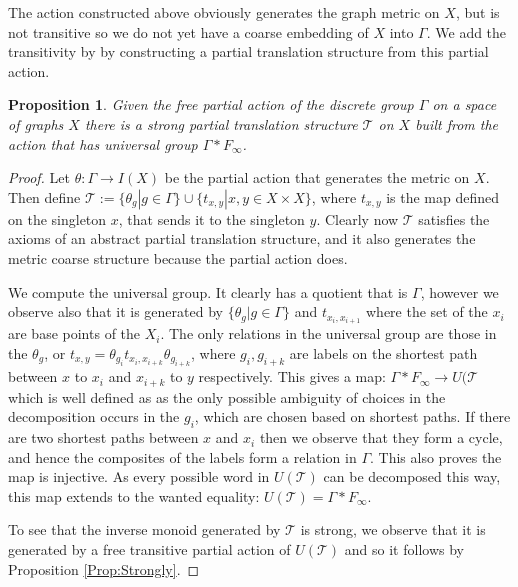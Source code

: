 \documentclass[11pt,a4paper]{amsart}
\theoremstyle{plain}
\newtheorem{proposition}[theorem]{Proposition}%
\theoremstyle{definition}%
\theoremstyle{remark}%
\begin{document}
The action constructed above obviously generates the graph metric on $X$, but is not transitive so we do not yet have a coarse embedding of $X$ into $\Gamma$. We add the transitivity by by constructing a partial translation structure from this partial action.

\begin{proposition}\label{Prop:CheapTrick}
Given the free partial action of the discrete group $\Gamma$ on a space of graphs $X$ there is a strong partial translation structure $\mathcal{T}$ on $X$ built from the action that has universal group $\Gamma\ast F_{\infty}$.
\end{proposition}
\begin{proof}
Let $\theta: \Gamma \rightarrow I(X)$ be the partial action that generates the metric on $X$. Then define $\mathcal{T}:=\lbrace \theta_{g} | g \in \Gamma \rbrace \cup \lbrace t_{x,y} | x,y \in X\times X \rbrace$, where $t_{x,y}$ is the map defined on the singleton $x$, that sends it to the singleton $y$. Clearly now $\mathcal{T}$ satisfies the axioms of an abstract partial translation structure, and it also generates the metric coarse structure because the partial action does. 

We compute the universal group. It clearly has a quotient that is $\Gamma$, however we observe also that it is generated by $\lbrace \theta_{g} | g \in \Gamma \rbrace$ and $t_{x_{i},x_{i+1}}$ where the set of the $x_{i}$ are base points of the $X_{i}$. The only relations in the universal group are those in the $\theta_{g}$, or $t_{x,y}=\theta_{g_{i}}t_{x_{i},x_{i+k}}\theta_{g_{i+k}}$, where $g_{i},g_{i+k}$ are labels on the shortest path between $x$ to $x_{i}$ and $x_{i+k}$ to $y$ respectively. This gives a map: $\Gamma \ast F_{\infty} \rightarrow U(\mathcal{T}$ which is well defined as as the only possible ambiguity of choices in the decomposition occurs in the $g_{i}$, which are chosen based on shortest paths. If there are two shortest paths between $x$ and $x_{i}$ then we observe that they form a cycle, and hence the composites of the labels form a relation in $\Gamma$. This also proves the map is  injective. As every possible word in $U(\mathcal{T})$ can be decomposed this way, this map extends to the wanted equality: $U(\mathcal{T})=\Gamma \ast F_{\infty}$.

To see that the inverse monoid generated by $\mathcal{T}$ is strong, we observe that it is generated by a free transitive partial action of $U(\mathcal{T})$ and so it follows by Proposition \ref{Prop:Strongly}.
\end{proof}
\end{document}
